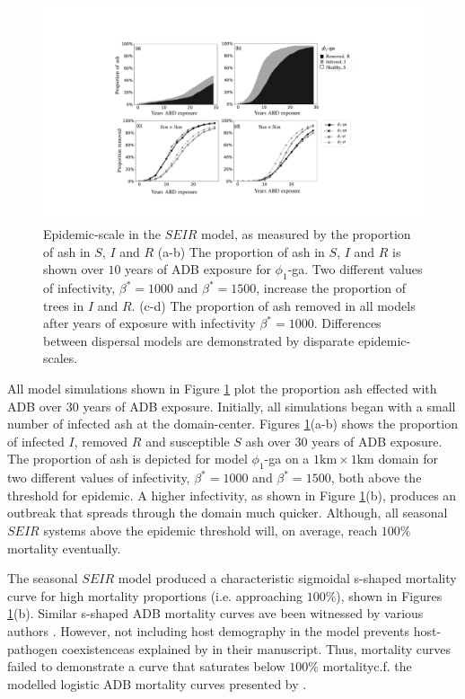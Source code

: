 \begin{figure}
    \centering
    \includegraphics[scale=0.42]{chapter6/figures/fig6-mortality.pdf}
    \caption{Epidemic-scale in the $SEIR$ model, as measured by the proportion of ash in $S$, $I$ and $R$ (a-b) The proportion of ash in $S$, $I$ and $R$ is shown over $10$ years of ADB exposure for $\phi_1$-ga. Two different values of infectivity, $\beta^*=1000$ and $\beta^*=1500$, increase the proportion of trees in $I$ and $R$. (c-d) The proportion of ash removed in all models after years of exposure with infectivity $\beta^*=1000$. Differences between dispersal models are demonstrated by disparate epidemic-scales.}
    \label{fig:ash-mortalty}
\end{figure}

All model simulations shown in Figure \ref{fig:ash-mortalty} plot the proportion ash effected with ADB over $30$ years of ADB exposure.
Initially, all simulations began with a small number of infected ash at the domain-center.
Figures \ref{fig:ash-mortalty}(a-b) shows the proportion of infected $I$, removed $R$ and susceptible $S$ ash over $30$ years of ADB exposure.
The proportion of ash is depicted for model $\phi_1$-ga on a $1\mathrm{km}\times 1 \mathrm{km}$ domain for two different values of infectivity, $\beta^*=1000$ and $\beta^*=1500$, both above the threshold for epidemic.
A higher infectivity, as shown in Figure \ref{fig:ash-mortalty}(b), produces an outbreak that spreads through the domain much quicker.
Although, all seasonal $SEIR$ systems above the epidemic threshold will, on average, reach $100\%$ mortality eventually.


The seasonal $SEIR$ model produced a characteristic sigmoidal s-shaped mortality curve for high mortality proportions (i.e. approaching $100\%$), shown in Figures \ref{fig:ash-mortalty}(b).
Similar s-shaped ADB mortality curves ave been witnessed by various authors \cite{https://doi.org/10.1002/ppp3.11, lohmus2014ash}.
However, not including host demography in the model prevents host-pathogen coexistence\textemdash as explained by \cite{time-varying-infectivity} in their manuscript.
Thus, mortality curves failed to demonstrate a curve that saturates below $100\%$ mortality\textemdash c.f. the modelled logistic ADB mortality curves presented by \cite{https://doi.org/10.1002/ppp3.11}.

